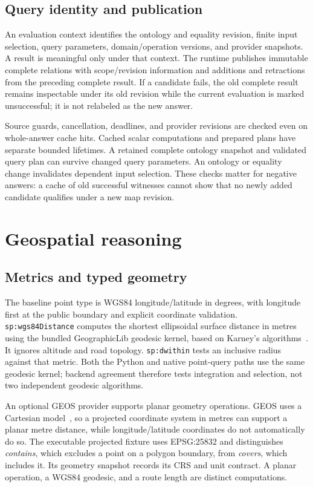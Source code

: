 \documentclass{article}
\newcommand{\code}[1]{\texttt{#1}}
\begin{document}
\subsection{Query identity and publication}
An evaluation context identifies the ontology and equality revision, finite
input selection, query parameters, domain/operation versions, and provider
snapshots. A result is meaningful only under that context. The runtime publishes
immutable complete relations with scope/revision information and additions and
retractions from the preceding complete result. If a candidate fails, the old
complete result remains inspectable under its old revision while the current
evaluation is marked unsuccessful; it is not relabeled as the new answer.

Source guards, cancellation, deadlines, and provider revisions are checked even
on whole-answer cache hits. Cached scalar computations and prepared plans have
separate bounded lifetimes. A retained complete ontology snapshot and validated
query plan can survive changed query parameters. An ontology or equality change
invalidates dependent input selection. These checks matter for negative answers:
a cache of old successful witnesses cannot show that no newly added candidate
qualifies under a new map revision.

\section{Geospatial reasoning}
\label{sec:spatial}
\subsection{Metrics and typed geometry}
The baseline point type is WGS84 longitude/latitude in degrees, with longitude
first at the public boundary and explicit coordinate validation.
\code{sp:wgs84Distance} computes the shortest ellipsoidal surface distance in
metres using the bundled GeographicLib geodesic kernel, based on
Karney's algorithms~\cite{karney2013}. It ignores altitude and road topology.
\code{sp:dwithin} tests an inclusive radius against that metric. Both the Python
and native point-query paths use the same geodesic kernel; backend agreement
therefore tests integration and selection, not two independent geodesic algorithms.

An optional GEOS provider supports planar geometry operations. GEOS uses a
Cartesian model~\cite{geos}, so a projected coordinate system in metres can
support a planar metre distance, while longitude/latitude coordinates do not
automatically do so. The executable projected fixture uses EPSG:25832 and
distinguishes \emph{contains}, which excludes a point on a polygon boundary,
from \emph{covers}, which includes it. Its geometry snapshot records its CRS and
unit contract. A planar operation, a WGS84 geodesic, and a route length are
distinct computations.
\end{document}
